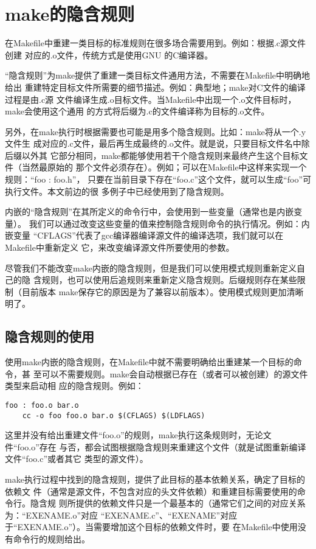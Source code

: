 ﻿\chapter{make的隐含规则}
在Makefile中重建一类目标的标准规则在很多场合需要用到。例如：根据.c源文件创建
对应的.o文件，传统方式是使用GNU 的C编译器。

“隐含规则”为make提供了重建一类目标文件通用方法，不需要在Makefile中明确地给出
重建特定目标文件所需要的细节描述。例如：典型地；make对C文件的编译过程是由.c源
文件编译生成.o目标文件。当Makefile中出现一个.o文件目标时，make会使用这个通用
的方式将后缀为.c的文件编译称为目标的.o文件。

另外，在make执行时根据需要也可能是用多个隐含规则。比如：make将从一个.y文件生
成对应的.c文件，最后再生成最终的.o文件。就是说，只要目标文件名中除后缀以外其
它部分相同，make都能够使用若干个隐含规则来最终产生这个目标文件（当然最原始的
那个文件必须存在）。例如；可以在Makefile中这样来实现一个规则：“foo : foo.h”，
只要在当前目录下存在“foo.c”这个文件，就可以生成“foo”可执行文件。本文前边的很
多例子中已经使用到了隐含规则。

内嵌的“隐含规则”在其所定义的命令行中，会使用到一些变量（通常也是内嵌变量）。
我们可以通过改变这些变量的值来控制隐含规则命令的执行情况。例如：内嵌变量
“CFLAGS”代表了gcc编译器编译源文件的编译选项，我们就可以在Makefile中重新定义
它，来改变编译源文件所要使用的参数。

尽管我们不能改变make内嵌的隐含规则，但是我们可以使用模式规则重新定义自己的隐
含规则，也可以使用后追规则来重新定义隐含规则。后缀规则存在某些限制（目前版本
make保存它的原因是为了兼容以前版本）。使用模式规则更加清晰明了。

\section{隐含规则的使用}
使用make内嵌的隐含规则，在Makefile中就不需要明确给出重建某一个目标的命令，甚
至可以不需要规则。make会自动根据已存在（或者可以被创建）的源文件类型来启动相
应的隐含规则。例如：

\begin{Verbatim}[]
foo : foo.o bar.o
    cc -o foo foo.o bar.o $(CFLAGS) $(LDFLAGS)
\end{Verbatim}

这里并没有给出重建文件“foo.o”的规则，make执行这条规则时，无论文件“foo.o”存在
与否，都会试图根据隐含规则来重建这个文件（就是试图重新编译文件“foo.c”或者其它
类型的源文件）。

make执行过程中找到的隐含规则，提供了此目标的基本依赖关系，确定了目标的依赖文
件（通常是源文件，不包含对应的头文件依赖）和重建目标需要使用的命令行。隐含规
则所提供的依赖文件只是一个最基本的（通常它们之间的对应关系为：“EXENAME.o”对应
“EXENAME.c”、“EXENAME”对应于“EXENAME.o”）。当需要增加这个目标的依赖文件时，要
在Makefile中使用没有命令行的规则给出。

